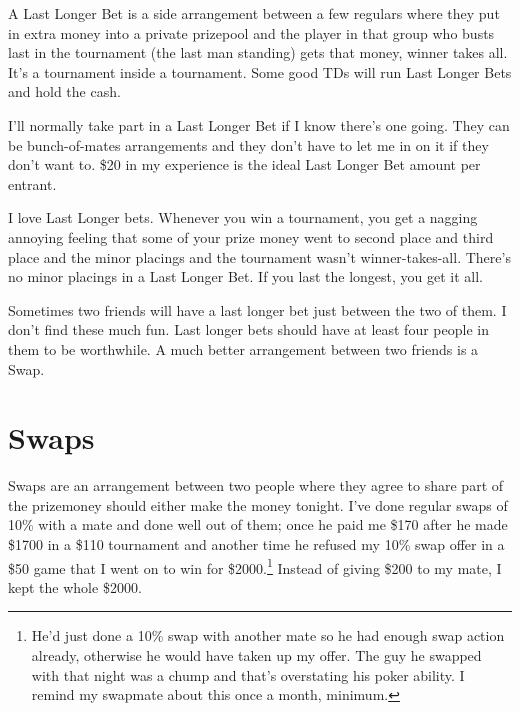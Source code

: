 A Last Longer Bet is a side arrangement between a few regulars
where they put in extra money into a private prizepool and the player
in that group who busts last in the tournament (the last man standing)
gets that money, winner takes all. It's a tournament inside a tournament.
Some good TDs will run Last Longer Bets and hold the cash.

I'll normally take part in a Last Longer Bet if I know there's one
going. They can be bunch-of-mates arrangements and
they don't have to let me in on it if they don't want to. \$20 in my
experience is the ideal Last Longer Bet amount per entrant.

I love Last Longer bets. Whenever you win a tournament, you get a
nagging annoying feeling that some of your prize money went to second
place and third place and the minor placings and the tournament wasn't
winner-takes-all. There's no minor placings in a Last Longer Bet. If
you last the longest, you get it all.

Sometimes two friends will have a last longer bet just between the two
of them. I don't find these much fun. Last longer bets should have at
least four people in them to be worthwhile. A much better arrangement
between two friends is a Swap.

\newpage

\section{Swaps}


Swaps are an arrangement between two people where they
agree to share part of the prizemoney should
either make the money tonight. I've done regular swaps of 10\% with a mate and
done well out of them; once he paid me
\$170 after he made \$1700 in a \$110 tournament and another time
he refused my 10\% swap offer in a \$50 game that I
went on to win for \$2000.\footnote{He'd
just done a 10\% swap with another mate so he had enough swap action
already, otherwise he would have taken up my offer. The
guy he swapped with that night was a chump and that's
overstating his poker ability. I remind my swapmate about this once
a month, minimum.} Instead of giving \$200 to my mate, I kept the whole
\$2000.

